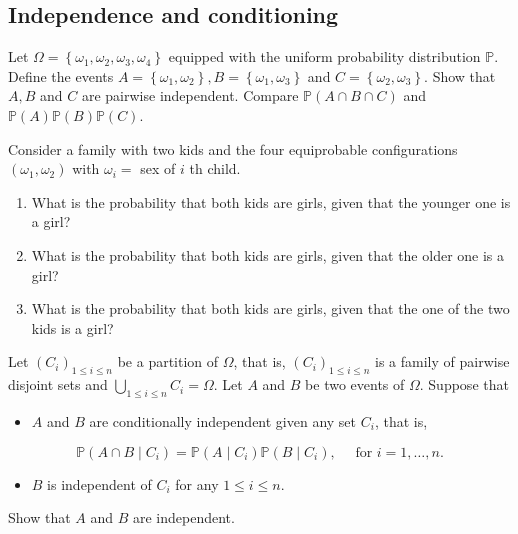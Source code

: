 \begin{center}
  \section*{Independence and conditioning}
\end{center}

\begin{Exercise}
  Let $\Omega=\left\{\omega_{1}, \omega_{2}, \omega_{3}, \omega_{4}\right\}$ equipped with the uniform probability distribution $\mathbb{P}$. Define the events $A=\left\{\omega_{1}, \omega_{2}\right\}, B=\left\{\omega_{1}, \omega_{3}\right\}$ and $C=\left\{\omega_{2}, \omega_{3}\right\}$. Show that $A, B$ and $C$ are pairwise independent. Compare $\mathbb{P}(A \cap B \cap C)$ and $\mathbb{P}(A) \mathbb{P}(B) \mathbb{P}(C)$.
\end{Exercise}

\begin{Exercise}
  Consider a family with two kids and the four equiprobable configurations $\left(\omega_{1}, \omega_{2}\right)$ with $\omega_{i}=$ sex of $i$ th child.

  \begin{enumerate}
    \item What is the probability that both kids are girls, given that the younger one is a girl?

    \item What is the probability that both kids are girls, given that the older one is a girl?

    \item What is the probability that both kids are girls, given that the one of the two kids is a girl?

  \end{enumerate}
\end{Exercise}

\begin{Exercise}


  Let $\left(C_{i}\right)_{1 \leq i \leq n}$ be a partition of $\Omega$, that is, $\left(C_{i}\right)_{1 \leq i \leq n}$ is a family of pairwise disjoint sets and $\bigcup_{1 \leq i \leq n} C_{i}=\Omega$. Let $A$ and $B$ be two events of $\Omega$. Suppose that

  \begin{itemize}
    \item $A$ and $B$ are conditionally independent given any set $C_{i}$, that is,
  \end{itemize}

  $$
    \mathbb{P}\left(A \cap B \mid C_{i}\right)=\mathbb{P}\left(A \mid C_{i}\right) \mathbb{P}\left(B \mid C_{i}\right), \quad \text { for } i=1, \ldots, n .
  $$

  \begin{itemize}
    \item $B$ is independent of $C_{i}$ for any $1 \leq i \leq n$.
  \end{itemize}

  Show that $A$ and $B$ are independent.
\end{Exercise}

